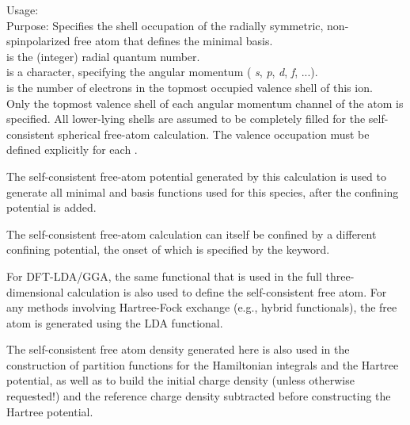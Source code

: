 {
  \noindent
  Usage:   
     \\[1.0ex]
  Purpose: Specifies the shell occupation of the radially symmetric,
    non-spinpolarized free atom that defines the minimal basis. \\[1.0ex]
   is the (integer) radial quantum number. \\
   is a character, specifying the angular momentum (
    \emph{s}, \emph{p}, \emph{d}, \emph{f}, ...). \\
   is the number of electrons in the topmost
    occupied valence shell of this ion. \\
}
Only the topmost valence shell of each angular momentum channel of the
atom is specified. All lower-lying shells are assumed to be completely
filled for the self-consistent spherical free-atom calculation. The
valence occupation must be defined explicitly for each .

The self-consistent free-atom potential generated by this calculation
is used to generate all minimal and 
basis functions used for this species, after the confining potential
is added. 

The self-consistent free-atom calculation can itself be confined by a
different confining potential, the onset of which is specified by the
 keyword.

For DFT-LDA/GGA, the same  functional that is used
in the full three-dimensional calculation is also used to define the
self-consistent free atom. For any methods involving Hartree-Fock
exchange (e.g., hybrid functionals), the free atom is generated using
the  LDA functional.

The self-consistent free atom density generated here is also used in
the construction of partition functions for the Hamiltonian integrals
and the Hartree potential, as well as to build the initial charge
density (unless otherwise requested!) and the reference charge density
subtracted before constructing the Hartree potential.


